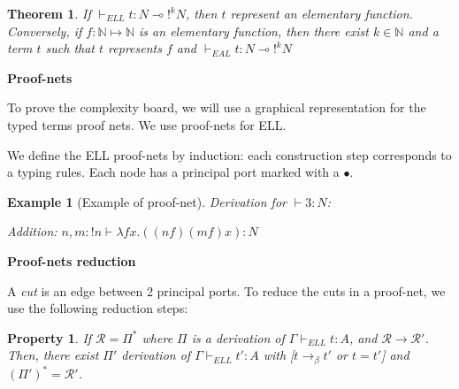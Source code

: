 \documentclass[a4paper,10pt]{article}
\newcommand{\limpl}{\multimap}  %
\newcommand{\pnet}{\mathcal{R}} %
\newcommand{\Nset}{\mathbb{N}} %
\newtheorem{prop}{Property}
\newtheorem{thm}{Theorem}
\newtheorem{ex}{Example}
\begin{document}
\begin{thm}
If $\vdash_{ELL} t:N \limpl !^{k} N$, then $t$ represent an elementary function.\\
Conversely, if $f: \Nset \mapsto \Nset$ is an elementary function, then there exist $k\in \Nset$ and a term $t$ such that $t$ represents $f$ and $\vdash_{EAL} t:N\limpl !^{k}N$
\end{thm}


\vspace{0.5cm}
\textbf{Proof-nets}

\par To prove the complexity board, we will use a graphical representation for the typed terms proof nets. We use proof-nets for ELL.



\par We define the ELL proof-nets by induction: each construction step corresponds to a typing rules. Each node has a principal port marked with a $\bullet$.


\begin{ex}[Example of proof-net]
\par Derivation for $\vdash 3:N$:\\


\par Addition: $n,m:!n \vdash \lambda f x. ((n f) (m f) x): N$


\end{ex}


\vspace{0.5cm}
\textbf{Proof-nets reduction}

\par A \emph{cut} is an edge between 2 principal ports. To reduce the cuts in a proof-net, we use the following reduction steps:


\begin{prop}
If $\pnet = \Pi^{*}$ where $\Pi$ is a derivation of $\Gamma \vdash_{ELL} t:A$, and $\pnet \rightarrow \pnet'$.\\
Then, there exist $\Pi'$ derivation of $\Gamma \vdash_{ELL} t':A$ with [$t \rightarrow_{\beta} t'$ or $t=t'$] and $(\Pi')^{*}=\pnet'$.
\end{prop}
\end{document}
